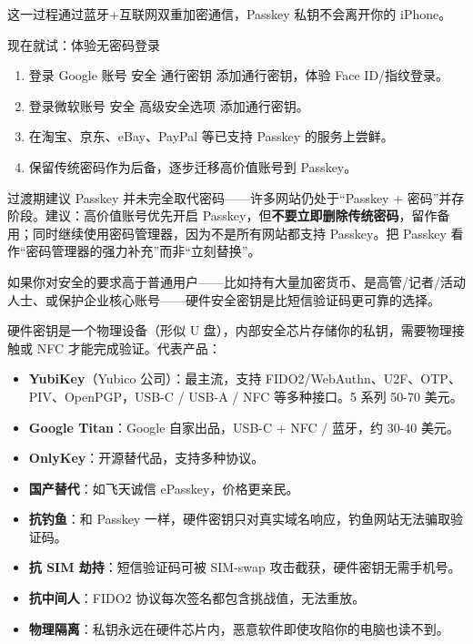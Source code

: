 这一过程通过蓝牙+互联网双重加密通信，Passkey 私钥不会离开你的 iPhone。

\begin{tcbpractice}{现在就试：体验无密码登录}
\begin{enumerate}
  \item 登录 Google 账号 安全 通行密钥 添加通行密钥，体验 Face ID/指纹登录。
  \item 登录微软账号 安全 高级安全选项 添加通行密钥。
  \item 在淘宝、京东、eBay、PayPal 等已支持 Passkey 的服务上尝鲜。
  \item 保留传统密码作为后备，逐步迁移高价值账号到 Passkey。
\end{enumerate}

\end{tcbpractice}

\begin{tcbwarn}{过渡期建议}
Passkey 并未完全取代密码——许多网站仍处于“Passkey + 密码”并存阶段。建议：高价值账号优先开启 Passkey，但\textbf{不要立即删除传统密码}，留作备用；同时继续使用密码管理器，因为不是所有网站都支持 Passkey。把 Passkey 看作“密码管理器的强力补充”而非“立刻替换”。

\end{tcbwarn}


如果你对安全的要求高于普通用户——比如持有大量加密货币、是高管/记者/活动人士、或保护企业核心账号——硬件安全密钥是比短信验证码更可靠的选择。


硬件密钥是一个物理设备（形似 U 盘），内部安全芯片存储你的私钥，需要物理接触或 NFC 才能完成验证。代表产品：

\begin{itemize}
  \item \textbf{YubiKey}（Yubico 公司）：最主流，支持 FIDO2/WebAuthn、U2F、OTP、PIV、OpenPGP，USB-C / USB-A / NFC 等多种接口。5 系列 50-70 美元。
  \item \textbf{Google Titan}：Google 自家出品，USB-C + NFC / 蓝牙，约 30-40 美元。
  \item \textbf{OnlyKey}：开源替代品，支持多种协议。
  \item \textbf{国产替代}：如飞天诚信 ePasskey，价格更亲民。
\end{itemize}


\begin{itemize}
  \item \textbf{抗钓鱼}：和 Passkey 一样，硬件密钥只对真实域名响应，钓鱼网站无法骗取验证码。
  \item \textbf{抗 SIM 劫持}：短信验证码可被 SIM-swap 攻击截获，硬件密钥无需手机号。
  \item \textbf{抗中间人}：FIDO2 协议每次签名都包含挑战值，无法重放。
  \item \textbf{物理隔离}：私钥永远在硬件芯片内，恶意软件即使攻陷你的电脑也读不到。
\end{itemize}

